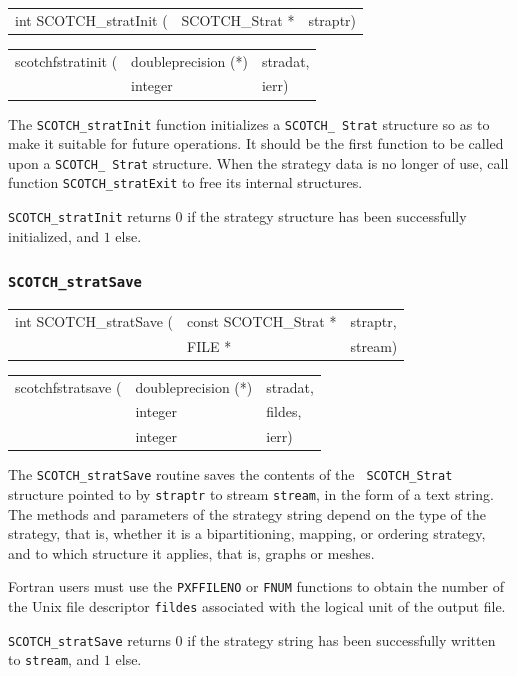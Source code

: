 \begin{itemize}
\progsyn

{\tt\begin{tabular}{l@{}ll}
int SCOTCH\_stratInit ( & SCOTCH\_Strat * & straptr)
\end{tabular}}

{\tt\begin{tabular}{l@{}ll}
scotchfstratinit ( & doubleprecision (*) & stradat, \\
                   & integer             & ierr)
\end{tabular}}

\progdes

The {\tt SCOTCH\_stratInit} function initializes a {\tt SCOTCH\_\lbt
Strat} structure so as to make it suitable for future operations. It
should be the first function to be called upon a {\tt SCOTCH\_\lbt
Strat} structure. When the strategy data is no longer of use, call
function {\tt SCOTCH\_\lbt strat\lbt Exit} to free its internal
structures.

\progret

{\tt SCOTCH\_stratInit} returns $0$ if the strategy structure has been
successfully initialized, and $1$ else.
\end{itemize}

\subsubsection{{\tt SCOTCH\_stratSave}}

\begin{itemize}
\progsyn

{\tt\begin{tabular}{l@{}ll}
int SCOTCH\_stratSave ( & const SCOTCH\_Strat * & straptr, \\
                        & FILE *                & stream)
\end{tabular}}

{\tt\begin{tabular}{l@{}ll}
scotchfstratsave ( & doubleprecision (*) & stradat, \\
                   & integer             & fildes, \\
                   & integer             & ierr)
\end{tabular}}

\progdes

The {\tt SCOTCH\_stratSave} routine saves the contents of the {\tt
SCOTCH\_\lbt Strat} structure pointed to by {\tt straptr} to stream
{\tt stream}, in the form of a text string. The methods and
parameters of the strategy string depend on the type of the strategy,
that is, whether it is a bipartitioning, mapping, or ordering
strategy, and to which structure it applies, that is, graphs or
meshes.

Fortran users must use the {\tt PXFFILENO} or {\tt FNUM} functions to
obtain the number of the Unix file descriptor {\tt fildes} associated
with the logical unit of the output file.

\progret

{\tt SCOTCH\_stratSave} returns $0$ if the strategy string has been
successfully written to {\tt stream}, and $1$ else.
\end{itemize}


